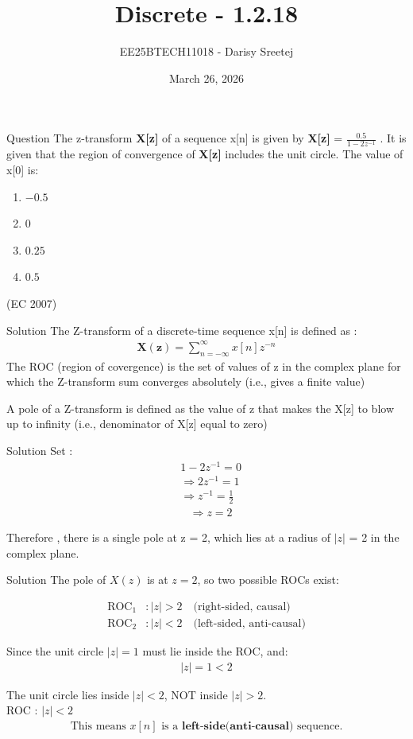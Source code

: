 \documentclass{beamer}
\title %
{Discrete - 1.2.18}
\date{March 26, 2026}
\author %
{EE25BTECH11018 - Darisy Sreetej}
\begin{document}
\frame{\titlepage}

\begin{frame}{Question}
The z-transform \textbf{X[z]} of a sequence x[n] is given by \textbf{X[z]} = $\frac{0.5}{1 - 2 z ^{-1}}$
. It is given that the region of convergence of \textbf{X[z]} includes the unit circle. The value of x[0] is:
 \begin{enumerate}
\item   $- 0.5$ 
\item   $0$
 \item $0.25$
\item  $0.5$
 \end{enumerate}
 \hfill(EC 2007)
\end{frame}
\begin{frame}{Solution}
The Z-transform of a discrete-time sequence x[n] is defined as :
\begin{align}
    \mathbf{X(z)} = \sum_{n=-\infty}^{\infty} x[n]  z^{-n}
\end{align}
The ROC (region of covergence) is the set of values of z in the complex plane for which the Z-transform sum converges absolutely (i.e., gives a finite value)

\quad

A pole of a Z-transform is defined as the value of z that makes the X[z] to blow up to infinity (i.e., denominator of X[z] equal to zero) 
\end{frame}
\begin{frame}{Solution}
Set :
\begin{align*}
& 1 - 2z^{-1} = 0 \\ 
&\Rightarrow 2z^{-1} = 1\\
&\Rightarrow z^{-1} = \frac{1}{2} 
\end{align*}
\begin{align}
&\Rightarrow z = 2
\end{align}

Therefore ,  there is a single pole at z = 2, which lies at a radius of $|z|$ = 2 in the complex plane.

\end{frame}

\begin{frame}{Solution}
The pole of $X(z)$ is at $z = 2$, so two possible ROCs exist:

\begin{align}
    \text{ROC}_1 &: |z| > 2 \quad \text{(right-sided, causal)} \\
    \text{ROC}_2 &: |z| < 2 \quad \text{(left-sided, anti-causal)}
\end{align}

Since the unit circle $|z| = 1$ must lie inside the ROC, and:
\begin{align}
    |z| = 1 < 2
\end{align}

The unit circle lies inside $|z| < 2$, NOT inside $|z| > 2$.\\


    ROC : $|z| < 2$ 
\begin{align}
\text{This means } x[n] \text{ is a } \textbf{left-side(anti-causal)} \text{ sequence}.
\end{align}
\end{frame}
\end{document}
